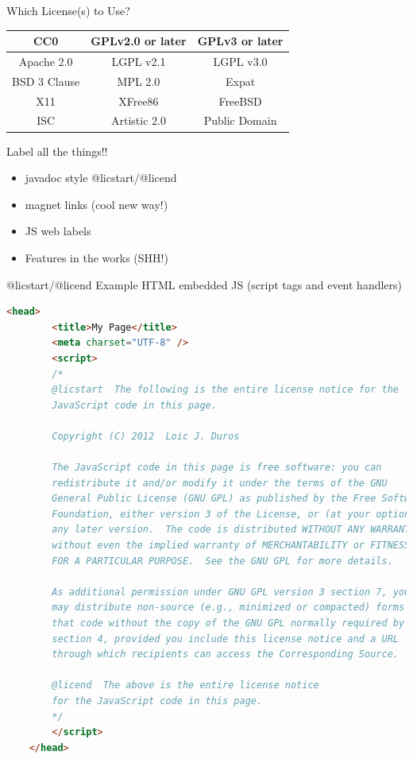 \documentclass[11pt]{beamer}
\begin{document}
\begin{frame}{Which License(s) to Use?}
\begin{tabular}{|c|c|c|}
\hline
CC0 & GPLv2.0 or later & GPLv3 or later\\
\hline
Apache 2.0 & LGPL v2.1 & LGPL v3.0\\
\hline
BSD 3 Clause & MPL 2.0 & Expat\\
\hline
X11 & XFree86 & FreeBSD\\
\hline
ISC & Artistic 2.0 & Public Domain\\
\hline
\end{tabular}
\end{frame}

\begin{frame}{Label all the things!!}
\begin{itemize}
\item javadoc style @licstart/@licend\pause
\item magnet links (cool new way!)\pause
\item JS web labels\pause
\item Features in the works (SHH!)
\end{itemize}
\end{frame}

\begin{frame}[fragile]{@licstart/@licend Example}
HTML embedded JS (script tags and event handlers)
\begin{lstlisting}[language=HTML]
    <head>
        <title>My Page</title>
        <meta charset="UTF-8" />
        <script>
        /*    
        @licstart  The following is the entire license notice for the 
        JavaScript code in this page.

        Copyright (C) 2012  Loic J. Duros

        The JavaScript code in this page is free software: you can
        redistribute it and/or modify it under the terms of the GNU
        General Public License (GNU GPL) as published by the Free Software
        Foundation, either version 3 of the License, or (at your option)
        any later version.  The code is distributed WITHOUT ANY WARRANTY;
        without even the implied warranty of MERCHANTABILITY or FITNESS
        FOR A PARTICULAR PURPOSE.  See the GNU GPL for more details.

        As additional permission under GNU GPL version 3 section 7, you
        may distribute non-source (e.g., minimized or compacted) forms of
        that code without the copy of the GNU GPL normally required by
        section 4, provided you include this license notice and a URL
        through which recipients can access the Corresponding Source.   

        @licend  The above is the entire license notice
        for the JavaScript code in this page.
        */
        </script>
    </head>
\end{lstlisting}
\end{frame}
\end{document}
